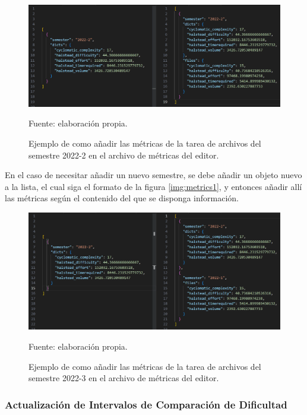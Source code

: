 \documentclass[letterpaper,12pt]{article}
\begin{document}
\begin{figure}[H]
  \centering
  \includegraphics[width=1\textwidth]{figures/metrics2.png}
  \caption{Ejemplo de como añadir las métricas de la tarea de archivos del semestre 2022-2 en el archivo de métricas del editor.} Fuente: elaboración propia.
  \label{img:metrics2}
\end{figure}
En el caso de necesitar añadir un nuevo semestre, se debe añadir un objeto nuevo a la lista, el cual siga el formato de la figura \ref{img:metrics1}, y entonces añadir allí las métricas según el contenido del que se disponga información.
\begin{figure}[H]
  \centering
  \includegraphics[width=1\textwidth]{figures/metrics3.png}
  \caption{Ejemplo de como añadir las métricas de la tarea de archivos del semestre 2022-3 en el archivo de métricas del editor.} Fuente: elaboración propia.
  \label{img:metrics3}
\end{figure}
\subsubsection{Actualización de Intervalos de Comparación de Dificultad} \label{sssec:comparisionIntMod}
\end{document}

